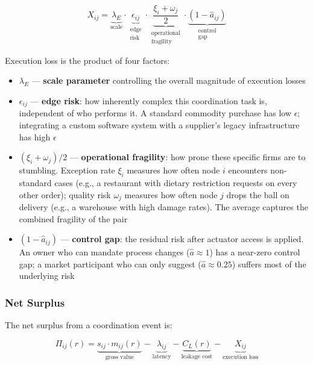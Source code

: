 \documentclass[12pt]{article}
\theoremstyle{definition}
\begin{document}
\begin{equation}
\label{eq:execloss}
X_{ij} = \underbrace{\lambda_E}_{\text{scale}} \cdot \underbrace{\epsilon_{ij}}_{\substack{\text{edge} \\ \text{risk}}} \cdot \underbrace{\frac{\xi_i + \omega_j}{2}}_{\substack{\text{operational} \\ \text{fragility}}} \cdot \underbrace{(1 - \hat{a}_{ij})}_{\substack{\text{control} \\ \text{gap}}}
\end{equation}

\noindent Execution loss is the product of four factors:
\begin{itemize}[leftmargin=*]
\item $\lambda_E$ --- \textbf{scale parameter} controlling the overall magnitude of execution losses
\item $\epsilon_{ij}$ --- \textbf{edge risk}: how inherently complex this coordination task is, independent of who performs it. A standard commodity purchase has low $\epsilon$; integrating a custom software system with a supplier's legacy infrastructure has high $\epsilon$
\item $(\xi_i + \omega_j)/2$ --- \textbf{operational fragility}: how prone these specific firms are to stumbling. Exception rate $\xi_i$ measures how often node $i$ encounters non-standard cases (e.g., a restaurant with dietary restriction requests on every other order); quality risk $\omega_j$ measures how often node $j$ drops the ball on delivery (e.g., a warehouse with high damage rates). The average captures the combined fragility of the pair
\item $(1 - \hat{a}_{ij})$ --- \textbf{control gap}: the residual risk after actuator access is applied. An owner who can mandate process changes ($\hat{a} \approx 1$) has a near-zero control gap; a market participant who can only suggest ($\hat{a} \approx 0.25$) suffers most of the underlying risk
\end{itemize}

\subsubsection{Net Surplus}

The net surplus from a coordination event is:

\begin{equation}
\label{eq:surplus}
\Pi_{ij}(r) = \underbrace{s_{ij} \cdot m_{ij}(r)}_{\text{gross value}} - \underbrace{\lambda_{ij}}_{\text{latency}} - \underbrace{C_L(r)}_{\text{leakage cost}} - \underbrace{X_{ij}}_{\text{execution loss}}
\end{equation}
\end{document}
